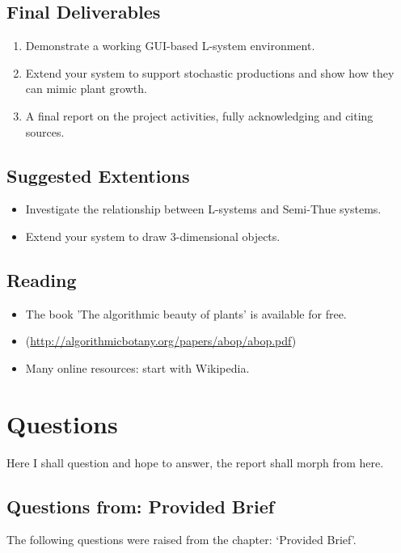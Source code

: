 \documentclass[11pt]{report}
\begin{document}
\section{Final Deliverables}
\begin{enumerate}
    \item Demonstrate a working GUI-based L-system environment.
    \item Extend your system to support stochastic productions and show how they can
          mimic plant growth.
    \item A final report on the project activities, fully acknowledging and citing
          sources.
\end{enumerate}

\section{Suggested Extentions}
\begin{itemize}
    \item Investigate the relationship between L-systems and Semi-Thue systems.
    \item Extend your system to draw 3-dimensional objects.
\end{itemize}

\section{Reading}
\begin{itemize}
    \item The book 'The algorithmic beauty of plants' is available for free.
    \item (\url{http://algorithmicbotany.org/papers/abop/abop.pdf})
    \item Many online resources: start with Wikipedia.
\end{itemize}

\cite{example-cite}

\chapter{Questions}
Here I shall question and hope to answer, the report shall morph from here.

\section{Questions from: Provided Brief}
The following questions were raised from the chapter: `Provided Brief'.
\end{document}
